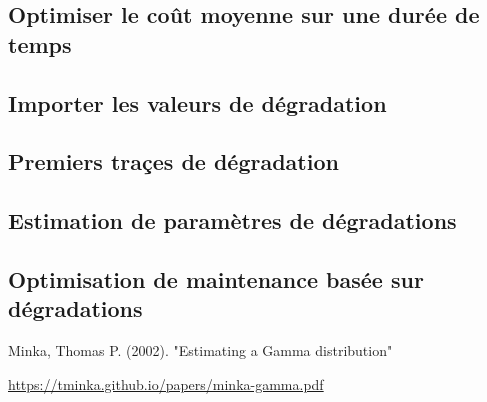 \documentclass[10pt,a4paper]{article}
\begin{document}
\subsection{Optimiser le coût moyenne sur une durée de temps}
\label{annexe:optim_e_c}

\subsection{Importer les valeurs de dégradation}
\label{annexe:import_degrad}

\subsection{Premiers traçes de dégradation}
\label{annexe:premier_plot_degrad}

\subsection{Estimation de paramètres de dégradations}
\label{annexe:estim_degrad}

\subsection{Optimisation de maintenance basée sur dégradations}
\label{annexe:optim_degrad}


\begin{thebibliography}{9}
     Minka, Thomas P. (2002). "Estimating a Gamma distribution"

    \url{https://tminka.github.io/papers/minka-gamma.pdf}
\end{thebibliography}
\end{document}
